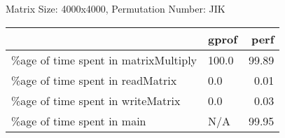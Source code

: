 \documentclass{article}
\begin{document}
    Matrix Size: 4000x4000, Permutation Number: JIK \\
    \begin{tabular}{llr}
\hline
                                      & gprof   &   perf \\
\hline
 \%age of time spent in matrixMultiply & 100.0   &  99.89 \\
 \%age of time spent in readMatrix     & 0.0     &   0.01 \\
 \%age of time spent in writeMatrix    & 0.0     &   0.03 \\
 \%age of time spent in main           & N/A     &  99.95 \\
\hline
\end{tabular}
    
\end{document}
